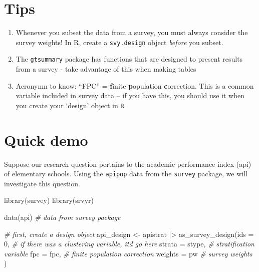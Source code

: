 \documentclass[
]{book}
\newenvironment{Shaded}{\begin{snugshade}}{\end{snugshade}}
\newcommand{\AttributeTok}[1]{\textcolor[rgb]{0.77,0.63,0.00}{#1}}
\newcommand{\CommentTok}[1]{\textcolor[rgb]{0.56,0.35,0.01}{\textit{#1}}}
\newcommand{\DecValTok}[1]{\textcolor[rgb]{0.00,0.00,0.81}{#1}}
\newcommand{\FunctionTok}[1]{\textcolor[rgb]{0.00,0.00,0.00}{#1}}
\newcommand{\NormalTok}[1]{#1}
\newcommand{\OtherTok}[1]{\textcolor[rgb]{0.56,0.35,0.01}{#1}}
\newcommand{\SpecialCharTok}[1]{\textcolor[rgb]{0.00,0.00,0.00}{#1}}
\begin{document}
\hypertarget{tips}{%
\section{Tips}\label{tips}}

\begin{enumerate}
\def\labelenumi{\arabic{enumi}.}
\item
  Whenever you subset the data from a survey, you must always consider the survey weights! In R, create a \texttt{svy.design} object \emph{before} you subset.
\item
  The \texttt{gtsummary} package has functions that are designed to present results from a survey - take advantage of this when making tables
\item
  Acronymn to know: ``FPC'' = \textbf{f}inite \textbf{p}opulation \textbf{c}orrection. This is a common variable included in survey data -- if you have this, you should use it when you create your `design' object in \texttt{R}.
\end{enumerate}

\hypertarget{quick-demo}{%
\section{Quick demo}\label{quick-demo}}

Suppose our research question pertains to the academic performance index (api) of elementary schools. Using the \texttt{apipop} data from the \texttt{survey} package, we will investigate this question.

\begin{Shaded}
\begin{Highlighting}[]
\FunctionTok{library}\NormalTok{(survey)}
\FunctionTok{library}\NormalTok{(srvyr)}

\FunctionTok{data}\NormalTok{(api) }\CommentTok{\# data from survey package}

\CommentTok{\# first, create a \textquotesingle{}design\textquotesingle{} object }
\NormalTok{api\_design }\OtherTok{\textless{}{-}}\NormalTok{ apistrat }\SpecialCharTok{|\textgreater{}} 
  \FunctionTok{as\_survey\_design}\NormalTok{(}\AttributeTok{ids =} \DecValTok{0}\NormalTok{, }\CommentTok{\# if there was a clustering variable, it\textquotesingle{}d go here}
                   \AttributeTok{strata =}\NormalTok{ stype, }\CommentTok{\# stratification variable }
                   \AttributeTok{fpc =}\NormalTok{ fpc, }\CommentTok{\# finite population correction }
                   \AttributeTok{weights =}\NormalTok{ pw }\CommentTok{\# survey weights }
\NormalTok{                   )}
\end{Highlighting}
\end{Shaded}
\end{document}
